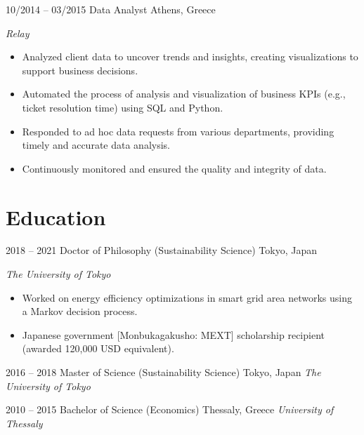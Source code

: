 \begin{entrylist}
\entry
{10/2014 -- 03/2015}
{Data Analyst}
{Athens, Greece}
{\emph{Relay}
\begin{itemize}
\item Analyzed client data to uncover trends and insights, creating visualizations to support business decisions. %
\item Automated the process of analysis and visualization of business KPIs (e.g., ticket resolution time) using SQL and Python. %
\item Responded to ad hoc data requests from various departments, providing timely and accurate data analysis. %
\item Continuously monitored and ensured the quality and integrity of data. %
\end{itemize}
}

\end{entrylist}

\section{Education}
\begin{entrylist}
\entry
{2018 -- 2021}
{Doctor of Philosophy  (Sustainability Science)}
{Tokyo, Japan}
{\emph{The University of Tokyo}
\begin{itemize}
\item Worked on energy efficiency optimizations in smart grid area networks using a Markov decision process.
\item Japanese government [Monbukagakusho: MEXT] scholarship recipient (awarded 120,000 USD equivalent).
\end{itemize}
}
\end{entrylist}
\begin{entrylist}
\entry
{2016 -- 2018}
{Master of Science (Sustainability Science)}
{Tokyo, Japan}
{\emph{The University of Tokyo}}
\end{entrylist}

\begin{entrylist}
\entry
{2010 -- 2015}
{Bachelor of Science (Economics)}
{Thessaly, Greece}
{\emph{University of Thessaly}}
\end{entrylist}



